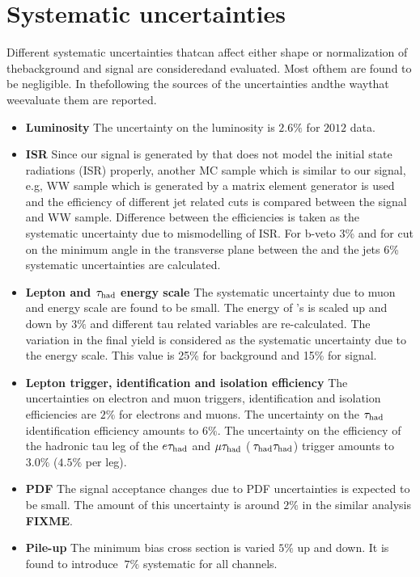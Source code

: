 \section{Systematic uncertainties}
\label{sect:sys}
Different systematic uncertainties thatcan affect either shape or normalization of thebackground and  signal are consideredand evaluated.
Most ofthem are found to be negligible. In thefollowing the sources of the uncertainties andthe waythat weevaluate them are reported.
\begin {itemize}
\item{{\bf Luminosity}} The uncertainty on the luminosity  is $2.6\%$ for $2012$ data.
\item{\bf ISR}
Since our signal is generated by \PYTHIA that does not  model the initial state radiations (ISR) properly, another MC sample which is similar to our signal, e.g, WW sample 
which is generated by a matrix element generator is used and the efficiency of different jet related cuts is compared between the signal and WW sample. Difference between the
efficiencies is taken as the systematic uncertainty due to mismodelling of ISR. For b-veto 3\% and for cut on   the minimum angle in the transverse plane between 
the \MET and the jets 6\% systematic uncertainties are  calculated.  
\item{\bf Lepton and $\tau_{\rm had}$ energy scale}
The systematic uncertainty due to muon and  energy scale are found to be small.
The energy of \hadtau's is scaled up and down by $3\%$ and different tau related variables are re-calculated.  The variation in the final yield is considered as the
systematic uncertainty due to the \Tau energy scale. This value is 25\% for background and 15\% for signal.
\item{\bf Lepton trigger, identification and isolation efficiency}
The uncertainties on electron and muon triggers, identification and isolation efficiencies are $2\%$ for electrons and muons. 
The uncertainty on the $\tau_{\rm had}$ identification efficiency amounts to $6\%$. 
The uncertainty on the efficiency of the hadronic tau leg of the $e\tau_{\rm had}$ and $\mu\tau_{\rm had}$ ($\,\tau_{\rm had}\tau_{\rm had}$) trigger amounts to $3.0\%$ ($4.5\%$ per leg).
\item{\bf PDF}
The signal acceptance changes due to PDF uncertainties is expected to be small. 
The amount of this uncertainty is around $2\%$ in the similar analysis {\bf FIXME}.
\item{\bf Pile-up}
The minimum bias cross section is varied $5 \%$ up and down. It is found to introduce $~7 \%$ systematic for all channels.    
\end{itemize}


